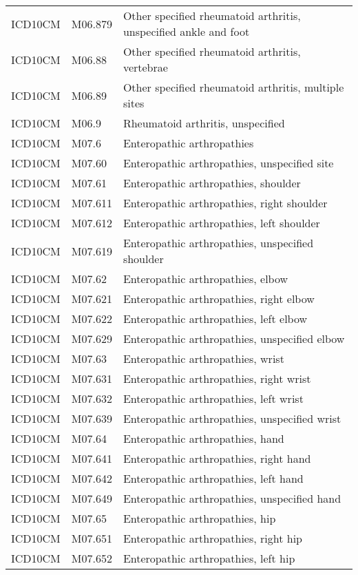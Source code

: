 \begin{longtable}{p{}p{}p{}}
  ICD10CM & M06.879 & Other specified rheumatoid arthritis, unspecified ankle and foot \\ 
  ICD10CM & M06.88 & Other specified rheumatoid arthritis, vertebrae \\ 
  ICD10CM & M06.89 & Other specified rheumatoid arthritis, multiple sites \\ 
  ICD10CM & M06.9 & Rheumatoid arthritis, unspecified \\ 
  ICD10CM & M07.6 & Enteropathic arthropathies \\ 
  ICD10CM & M07.60 & Enteropathic arthropathies, unspecified site \\ 
  ICD10CM & M07.61 & Enteropathic arthropathies, shoulder \\ 
  ICD10CM & M07.611 & Enteropathic arthropathies, right shoulder \\ 
  ICD10CM & M07.612 & Enteropathic arthropathies, left shoulder \\ 
  ICD10CM & M07.619 & Enteropathic arthropathies, unspecified shoulder \\ 
  ICD10CM & M07.62 & Enteropathic arthropathies, elbow \\ 
  ICD10CM & M07.621 & Enteropathic arthropathies, right elbow \\ 
  ICD10CM & M07.622 & Enteropathic arthropathies, left elbow \\ 
  ICD10CM & M07.629 & Enteropathic arthropathies, unspecified elbow \\ 
  ICD10CM & M07.63 & Enteropathic arthropathies, wrist \\ 
  ICD10CM & M07.631 & Enteropathic arthropathies, right wrist \\ 
  ICD10CM & M07.632 & Enteropathic arthropathies, left wrist \\ 
  ICD10CM & M07.639 & Enteropathic arthropathies, unspecified wrist \\ 
  ICD10CM & M07.64 & Enteropathic arthropathies, hand \\ 
  ICD10CM & M07.641 & Enteropathic arthropathies, right hand \\ 
  ICD10CM & M07.642 & Enteropathic arthropathies, left hand \\ 
  ICD10CM & M07.649 & Enteropathic arthropathies, unspecified hand \\ 
  ICD10CM & M07.65 & Enteropathic arthropathies, hip \\ 
  ICD10CM & M07.651 & Enteropathic arthropathies, right hip \\ 
  ICD10CM & M07.652 & Enteropathic arthropathies, left hip \\ 

\end{longtable}
